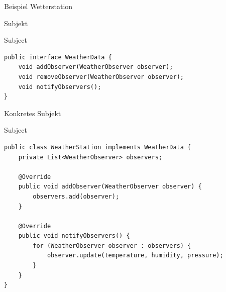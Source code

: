 \begin{frame}{Beispiel Wetterstation}
\end{frame}

\begin{frame}[fragile]{Subjekt}
	\begin{exampleblock}{Subject}
 		\begin{lstlisting}
public interface WeatherData {
    void addObserver(WeatherObserver observer);
    void removeObserver(WeatherObserver observer);
    void notifyObservers();
}
 		\end{lstlisting}
 	\end{exampleblock}
\end{frame}

\begin{frame}[fragile]{Konkretes Subjekt}
	\begin{exampleblock}{Subject}
 		\begin{lstlisting}
public class WeatherStation implements WeatherData {
    private List<WeatherObserver> observers;

    @Override
    public void addObserver(WeatherObserver observer) {
        observers.add(observer);
    }

    @Override
    public void notifyObservers() {
        for (WeatherObserver observer : observers) {
            observer.update(temperature, humidity, pressure);
        }
    }
}
 		\end{lstlisting}
 	\end{exampleblock}
\end{frame}

